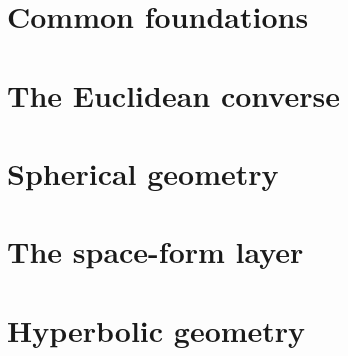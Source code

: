 %



\part{Common foundations}




\part{The Euclidean converse}










\part{Spherical geometry}






\part{The space-form layer}



\part{Hyperbolic geometry}




